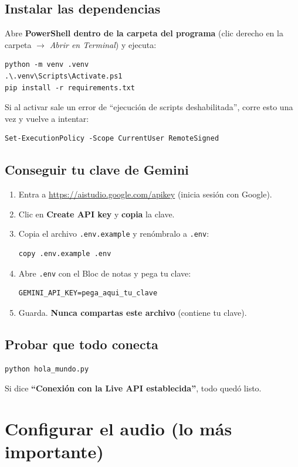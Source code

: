 \documentclass[11pt,a4paper]{article}
\begin{document}
\subsection{Instalar las dependencias}
Abre \textbf{PowerShell dentro de la carpeta del programa} (clic derecho en la
carpeta $\rightarrow$ \textit{Abrir en Terminal}) y ejecuta:
\begin{lstlisting}
python -m venv .venv
.\.venv\Scripts\Activate.ps1
pip install -r requirements.txt
\end{lstlisting}
Si al activar sale un error de ``ejecución de scripts deshabilitada'', corre esto
una vez y vuelve a intentar:
\begin{lstlisting}
Set-ExecutionPolicy -Scope CurrentUser RemoteSigned
\end{lstlisting}

\subsection{Conseguir tu clave de Gemini}
\begin{enumerate}[leftmargin=*]
  \item Entra a \url{https://aistudio.google.com/apikey} (inicia sesión con Google).
  \item Clic en \textbf{Create API key} y \textbf{copia} la clave.
  \item Copia el archivo \texttt{.env.example} y renómbralo a \texttt{.env}:
  \begin{lstlisting}
copy .env.example .env
  \end{lstlisting}
  \item Abre \texttt{.env} con el Bloc de notas y pega tu clave:
  \begin{lstlisting}
GEMINI_API_KEY=pega_aqui_tu_clave
  \end{lstlisting}
  \item Guarda. \textbf{Nunca compartas este archivo} (contiene tu clave).
\end{enumerate}

\subsection{Probar que todo conecta}
\begin{lstlisting}
python hola_mundo.py
\end{lstlisting}
Si dice \textbf{``Conexión con la Live API establecida''}, todo quedó listo.

\section{Configurar el audio (lo más importante)}
\end{document}
